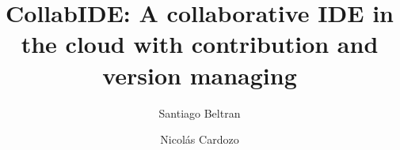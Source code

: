 \documentclass[draft]{llncs}
\begin{document}

\title{CollabIDE: A collaborative IDE in the cloud with contribution and version managing}

%
%
%
%
%


\author{
Santiago Beltran \and Nicol\'{a}s Cardozo}





\maketitle

\begin{abstract}
\end{abstract}


%
%
\end{document}
